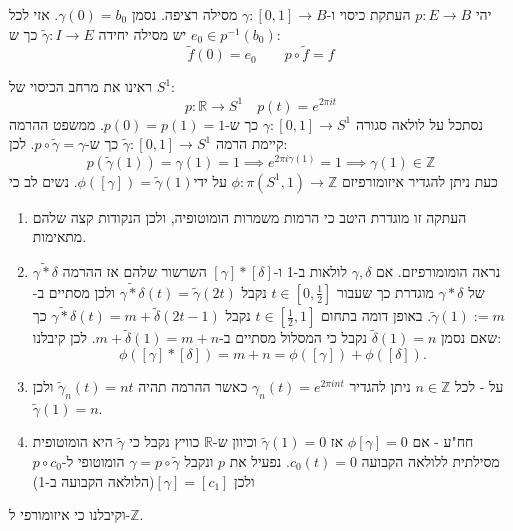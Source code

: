 \documentclass{tstextbook}
\begin{document}
\begin{proposition}
יהי \(p:E\to B\) העתקת כיסוי ו-\(\gamma:[0,1]\to B\) מסילה רציפה. נסמן \(\gamma(0)=b_{0}\). אזי לכל \(e_{0} \in p ^{-1}(b_{0})\) יש מסילה יחידה \(\tilde{\gamma}:I\to E\) כך ש:
$$\tilde{f}(0)=e_{0}\qquad p\circ\tilde{f}=f$$

\end{proposition}
\begin{example}
ראינו את מרחב הכיסוי של \(S^{1}\):
$$p:\mathbb{R}\to S^{1}\quad p(t)=e^{2\pi i t}$$
נסתכל על לולאה סגורה \(\gamma:[0,1]\to S^{1}\) כך ש-\(p(0)=p(1)=1\). ממשפט ההרמה קיימת הרמה \(\tilde{\gamma}:[0,1]\to S^{1}\) כך ש-\(p\circ \tilde{\gamma}=\gamma\). לכן:
$$p\left( \tilde{\gamma}(1) \right)=\gamma(1)=1\implies e^{ 2\pi i\gamma(1) }=1\implies \gamma(1)\in \mathbb{Z}$$
כעת ניתן להגדיר איזומורפיזם \(\phi:\pi(S^{1},1)\to\mathbb{Z}\) על ידי\(\phi\left( \left[ \gamma \right] \right)=\tilde{\gamma}(1)\). נשים לב כי 

  \begin{enumerate}
    \item העתקה זו מוגדרת היטב כי הרמות משמרות הומוטופיה, ולכן הנקודות קצה שלהם מתאימות.  


    \item נראה הומומורפיזם. אם \(\gamma,\delta\) לולאות ב-1 ו-\(\left[ \gamma \right]*\left[ \delta \right]\) השרשור שלהם אז ההרמה \(\widetilde{\gamma*\delta}\) של \(\gamma * \delta\) מוגדרת כך שעבור \(t \in \left[ 0,\frac{1}{2} \right]\) נקבל \(\widetilde{\gamma*\delta}(t)=\tilde{\gamma}(2t)\) ולכן מסתיים ב-\(\tilde{\gamma}(1):= m\). באופן דומה בתחום \(t\in\left[ \frac{1}{2},1 \right]\) נקבל \(\widetilde{\gamma*\delta}(t)=m+\tilde{\delta}(2t-1)\) כך שאם נסמן \(\tilde{\delta}(1)=n\) נקבל כי המסלול מסתיים ב-\(m+\tilde{\delta}(1)=m+n\). לכן קיבלנו: 
$$\phi([\gamma]*[\delta])=m+n=\phi([\gamma])+\phi([\delta]).$$


    \item על - לכל \(n \in \mathbb{Z}\) ניתן להגדיר \(\gamma_{n}(t)=e^{ 2\pi in t }\) כאשר ההרמה תהיה \(\tilde{\gamma}_{n}(t)=nt\) ולכן \(\tilde{\gamma}(1)=n\).  


    \item חח"ע - אם \(\phi\left[ \gamma \right]=0\) אז \(\tilde{\gamma}(1)=0\) וכיוון ש-\(\mathbb{R}\) כוויץ נקבל כי \(\tilde{\gamma}\) היא הומוטופית מסילתית ללולאה הקבועה \(c_{0}(t)=0\). נפעיל את \(p\) ונקבל \(\gamma=p\circ \tilde{\gamma}\) הומוטופי ל-\(p\circ c_{0}\) ולכן \(\left[ \gamma \right]=[c_{1}]\)(הלולאה הקבועה ב-1) 


  \end{enumerate}
\end{example}
וקיבלנו כי איזומורפי ל-\(\mathbb{Z}\).
\end{document}

